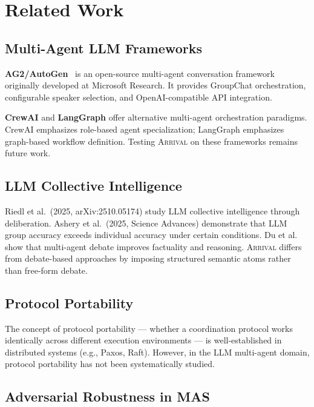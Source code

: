 \documentclass[11pt,a4paper]{article}
\newcommand{\arrival}{\textsc{Arrival}\xspace}
\begin{document}
\section{Related Work}\label{sec:related}

\subsection{Multi-Agent LLM Frameworks}

\textbf{AG2/AutoGen}~\cite{wu2023autogen} is an open-source multi-agent
conversation framework originally developed at Microsoft Research.  It
provides GroupChat orchestration, configurable speaker selection, and
OpenAI-compatible API integration.

\textbf{CrewAI} and \textbf{LangGraph} offer alternative multi-agent
orchestration paradigms.  CrewAI emphasizes role-based agent
specialization; LangGraph emphasizes graph-based workflow definition.
Testing \arrival on these frameworks remains future work.

\subsection{LLM Collective Intelligence}

Riedl et al.\ (2025, arXiv:2510.05174) study LLM collective
intelligence through deliberation.  Ashery et al.\ (2025, Science
Advances) demonstrate that LLM group accuracy exceeds individual
accuracy under certain conditions.  Du et al.~\cite{du2024debate} show
that multi-agent debate improves factuality and reasoning.  \arrival
differs from debate-based approaches by imposing structured semantic
atoms rather than free-form debate.

\subsection{Protocol Portability}

The concept of protocol portability --- whether a coordination protocol
works identically across different execution environments --- is
well-established in distributed systems (e.g., Paxos, Raft).  However,
in the LLM multi-agent domain, protocol portability has not been
systematically studied.

\subsection{Adversarial Robustness in MAS}
\end{document}
